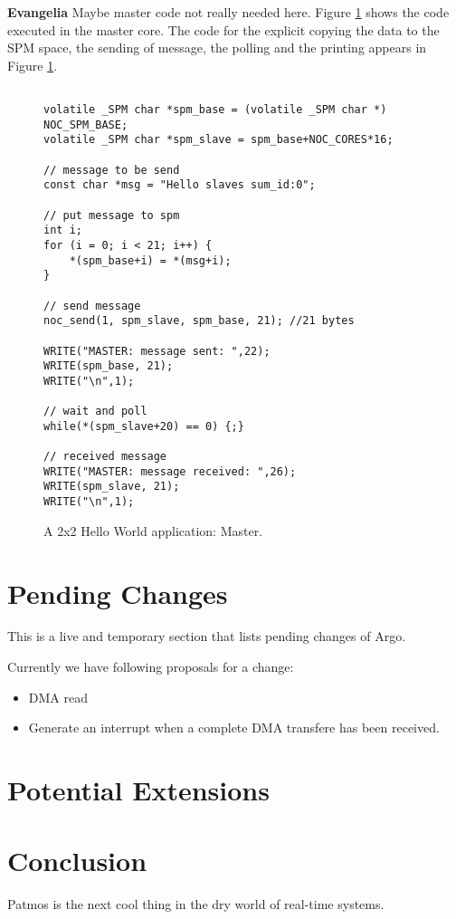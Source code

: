 \documentclass[a4paper,fontsize=10pt,twoside,DIV15,BCOR12mm,headinclude=true,footinclude=false,pagesize,bibtotoc]{scrbook}
\newcommand{\comment}[3]{

\textsf{\textbf{#1}} {\color{#3}#2}}
\newcommand{\eva}[1]{\comment{Evangelia}{#1}{Green}}
\begin{document}
\eva{Maybe master code not really needed here.}
Figure \ref{fig:hello_master} shows the code executed in the master core. The code for the explicit copying the data to the SPM space, the sending of message, the polling and the printing appears in  Figure \ref{fig:hello_master}.

\begin{figure}
\begin{verbatim}

volatile _SPM char *spm_base = (volatile _SPM char *) NOC_SPM_BASE;
volatile _SPM char *spm_slave = spm_base+NOC_CORES*16;

// message to be send
const char *msg = "Hello slaves sum_id:0";

// put message to spm
int i;
for (i = 0; i < 21; i++) {
	*(spm_base+i) = *(msg+i);
}

// send message
noc_send(1, spm_slave, spm_base, 21); //21 bytes

WRITE("MASTER: message sent: ",22);
WRITE(spm_base, 21);
WRITE("\n",1);

// wait and poll
while(*(spm_slave+20) == 0) {;}

// received message
WRITE("MASTER: message received: ",26);
WRITE(spm_slave, 21);
WRITE("\n",1);

\end{verbatim}
\caption{A 2x2 Hello World application: Master.}
\label{fig:hello_master}
\end{figure}

\chapter{Pending Changes}

This is a live and temporary section that lists pending changes of Argo.

Currently we have following proposals for a change:

\begin{itemize}
\item DMA read
\item Generate an interrupt when a complete DMA transfere has been received. 
\end{itemize}

\chapter{Potential Extensions}

\chapter{Conclusion}
\label{sec:conclusion}

Patmos is the next cool thing in the dry world of real-time systems.



\end{document}
